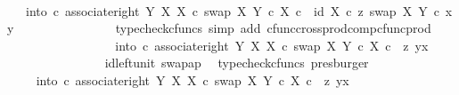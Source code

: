 \begin{isabellebody}
\ \ \ \ \ \ \ \ \ \ \ \ \isamarkupfalse%
\ \isamarkupfalse%
\ {\isachardoublequoteopen}{\isachardot}{\kern0pt}{\isachardot}{\kern0pt}{\isachardot}{\kern0pt}\ {\isacharequal}{\kern0pt}\ {\isacharparenleft}{\kern0pt}into\ {\isasymcirc}\isactrlsub c\ associate{\isacharunderscore}{\kern0pt}right\ Y\ X\ X\ {\isasymcirc}\isactrlsub c\ swap\ X\ {\isacharparenleft}{\kern0pt}Y\ {\isasymtimes}\isactrlsub c\ X{\isacharparenright}{\kern0pt}{\isacharparenright}{\kern0pt}\ {\isasymcirc}\isactrlsub c\ \ {\isasymlangle}id\ X\ {\isasymcirc}\isactrlsub c\ z{\isacharcomma}{\kern0pt}\ swap\ X\ Y\ {\isasymcirc}\isactrlsub c\ {\isasymlangle}x{\isacharcomma}{\kern0pt}y{\isasymrangle}{\isasymrangle}{\isachardoublequoteclose}\isanewline
\ \ \ \ \ \ \ \ \ \ \ \ \ \ \isamarkupfalse%
\ {\isacharparenleft}{\kern0pt}typecheck{\isacharunderscore}{\kern0pt}cfuncs{\isacharcomma}{\kern0pt}\ simp\ add{\isacharcolon}{\kern0pt}\ cfunc{\isacharunderscore}{\kern0pt}cross{\isacharunderscore}{\kern0pt}prod{\isacharunderscore}{\kern0pt}comp{\isacharunderscore}{\kern0pt}cfunc{\isacharunderscore}{\kern0pt}prod{\isacharparenright}{\kern0pt}\isanewline
\ \ \ \ \ \ \ \ \ \ \ \ \isamarkupfalse%
\ \isamarkupfalse%
\ {\isachardoublequoteopen}{\isachardot}{\kern0pt}{\isachardot}{\kern0pt}{\isachardot}{\kern0pt}\ {\isacharequal}{\kern0pt}\ {\isacharparenleft}{\kern0pt}into\ {\isasymcirc}\isactrlsub c\ associate{\isacharunderscore}{\kern0pt}right\ Y\ X\ X\ {\isasymcirc}\isactrlsub c\ swap\ X\ {\isacharparenleft}{\kern0pt}Y\ {\isasymtimes}\isactrlsub c\ X{\isacharparenright}{\kern0pt}{\isacharparenright}{\kern0pt}\ {\isasymcirc}\isactrlsub c\ \ {\isasymlangle}z{\isacharcomma}{\kern0pt}\ {\isasymlangle}y{\isacharcomma}{\kern0pt}x{\isasymrangle}{\isasymrangle}{\isachardoublequoteclose}\isanewline
\ \ \ \ \ \ \ \ \ \ \ \ \ \ \isamarkupfalse%
\ id{\isacharunderscore}{\kern0pt}left{\isacharunderscore}{\kern0pt}unit{}\ swap{\isacharunderscore}{\kern0pt}ap\ \isamarkupfalse%
\ {\isacharparenleft}{\kern0pt}typecheck{\isacharunderscore}{\kern0pt}cfuncs{\isacharcomma}{\kern0pt}\ presburger{\isacharparenright}{\kern0pt}\isanewline
\ \ \ \ \ \ \ \ \ \ \ \ \isamarkupfalse%
\ \isamarkupfalse%
\ {\isachardoublequoteopen}{\isachardot}{\kern0pt}{\isachardot}{\kern0pt}{\isachardot}{\kern0pt}\ {\isacharequal}{\kern0pt}\ into\ {\isasymcirc}\isactrlsub c\ associate{\isacharunderscore}{\kern0pt}right\ Y\ X\ X\ {\isasymcirc}\isactrlsub c\ swap\ X\ {\isacharparenleft}{\kern0pt}Y\ {\isasymtimes}\isactrlsub c\ X{\isacharparenright}{\kern0pt}\ {\isasymcirc}\isactrlsub c\ \ {\isasymlangle}z{\isacharcomma}{\kern0pt}\ {\isasymlangle}y{\isacharcomma}{\kern0pt}x{\isasymrangle}{\isasymrangle}{\isachardoublequoteclose}\isanewline

\end{isabellebody}
